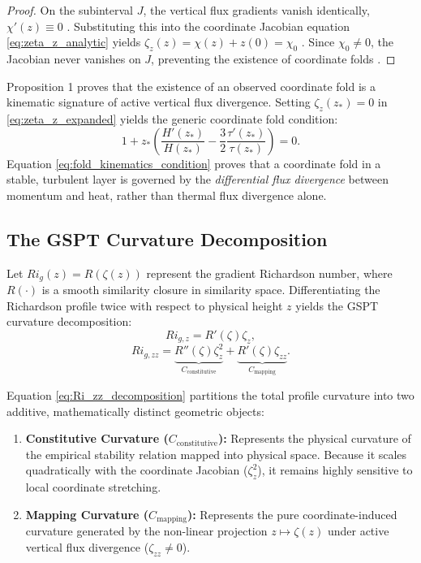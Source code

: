 \documentclass[draft,11pt,twocolumn]{article}
\theoremstyle{definition}
\theoremstyle{remark}
\begin{document}
\begin{proof}
On the subinterval $J$, the vertical flux gradients vanish identically, $\chi'(z) \equiv 0$ \cite{STABILITY}. Substituting this into the coordinate Jacobian equation \eqref{eq:zeta_z_analytic} yields $\zeta_z(z) = \chi(z) + z(0) = \chi_0$ \cite{STABILITY}. Since $\chi_0 \neq 0$, the Jacobian never vanishes on $J$, preventing the existence of coordinate folds \cite{STABILITY}.
\end{proof}

Proposition 1 proves that the existence of an observed coordinate fold is a kinematic signature of active vertical flux divergence. Setting $\zeta_z(z_*) = 0$ in \eqref{eq:zeta_z_expanded} yields the generic coordinate fold condition:
\begin{equation}
    1 + z_* \left( \frac{H'(z_*)}{H(z_*)} - \frac{3}{2}\frac{\tau'(z_*)}{\tau(z_*)} \right) = 0. \label{eq:fold_kinematics_condition}
\end{equation}
Equation \eqref{eq:fold_kinematics_condition} proves that a coordinate fold in a stable, turbulent layer is governed by the \textit{differential flux divergence} between momentum and heat, rather than thermal flux divergence alone.

\subsection{The GSPT Curvature Decomposition}

Let $Ri_g(z) = R(\zeta(z))$ represent the gradient Richardson number, where $R(\cdot)$ is a smooth similarity closure in similarity space. Differentiating the Richardson profile twice with respect to physical height $z$ yields the GSPT curvature decomposition:
\begin{equation}
    Ri_{g,z} = R'(\zeta) \zeta_z, \label{eq:Ri_z_chain}
\end{equation}
\begin{equation}
    Ri_{g,zz} = \underbrace{R''(\zeta) \zeta_z^2}_{C_{\text{constitutive}}} + \underbrace{R'(\zeta) \zeta_{zz}}_{C_{\text{mapping}}}. \label{eq:Ri_zz_decomposition}
\end{equation}

Equation \eqref{eq:Ri_zz_decomposition} partitions the total profile curvature into two additive, mathematically distinct geometric objects:
\begin{enumerate}
    \item \textbf{Constitutive Curvature ($C_{\text{constitutive}}$):} Represents the physical curvature of the empirical stability relation mapped into physical space. Because it scales quadratically with the coordinate Jacobian ($\zeta_z^2$), it remains highly sensitive to local coordinate stretching.
    \item \textbf{Mapping Curvature ($C_{\text{mapping}}$):} Represents the pure coordinate-induced curvature generated by the non-linear projection $z \mapsto \zeta(z)$ under active vertical flux divergence ($\zeta_{zz} \neq 0$).
\end{enumerate}
\end{document}
